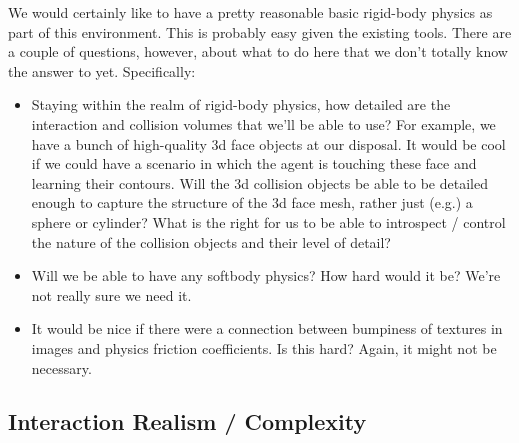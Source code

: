 \documentclass[12pt]{article}
\begin{document}
We would certainly like to have a pretty reasonable basic rigid-body physics as part of this environment.  This is probably easy given the existing tools.   There are a couple of questions, however, about what to do here that we don't totally know the answer to yet.  Specifically:
\begin{itemize}
    \item  Staying within the realm of rigid-body physics, how detailed are the interaction and collision volumes that we'll be able to use?   For example, we have a bunch of high-quality 3d face objects at our disposal.  It would be cool if we could have a scenario in which the agent is touching these face and learning their contours.   Will the 3d collision objects be able to be detailed enough to capture the structure of the 3d face mesh, rather just (e.g.) a sphere or cylinder?  What is the right for us to be able to introspect / control the nature of the collision objects and their level of detail? 
    \item  Will we be able to have any softbody physics?   How hard would it be?   We're not really sure we need it.  
    \item  It would be nice if there were a connection between bumpiness of textures in images and physics friction coefficients.  Is this hard?  Again, it might not be necessary. 
\end{itemize}


\subsection*{Interaction Realism / Complexity}
\end{document}
